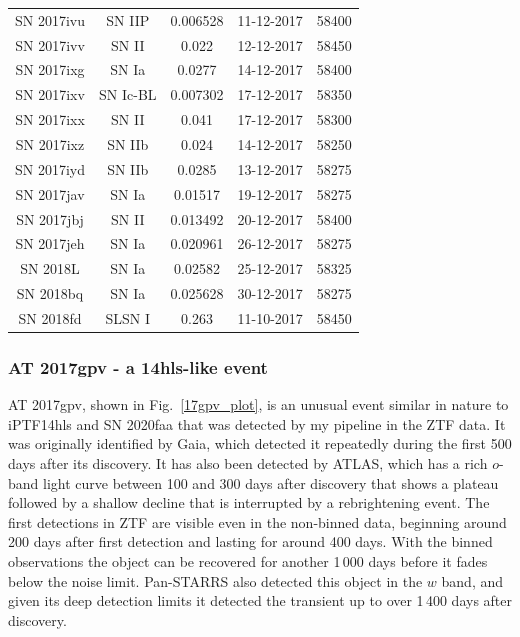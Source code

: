 \documentclass[a4paper,oneside,12pt, class=Latex/Classes/PhDthesisPSnPDF, crop=false]{standalone}
\begin{document}
\begin{longtable}{ccccc}
 SN 2017ivu & SN IIP & 0.006528 & 11-12-2017 & 58400 \\
 SN 2017ivv & SN II & 0.022 & 12-12-2017 & 58450 \\
 SN 2017ixg & SN Ia & 0.0277 & 14-12-2017 & 58400 \\
 SN 2017ixv & SN Ic-BL & 0.007302 & 17-12-2017 & 58350 \\
 SN 2017ixx & SN II & 0.041 & 17-12-2017 & 58300 \\
 SN 2017ixz & SN IIb & 0.024 & 14-12-2017 & 58250 \\
 SN 2017iyd & SN IIb & 0.0285 & 13-12-2017 & 58275 \\
 SN 2017jav & SN Ia & 0.01517 & 19-12-2017 & 58275 \\
 SN 2017jbj & SN II & 0.013492 & 20-12-2017 & 58400 \\
 SN 2017jeh & SN Ia & 0.020961 & 26-12-2017 & 58275 \\
 SN 2018L & SN Ia & 0.02582 & 25-12-2017 & 58325 \\
 SN 2018bq & SN Ia & 0.025628 & 30-12-2017 & 58275 \\
 SN 2018fd & SLSN I & 0.263 & 11-10-2017 & 58450 \\
\end{longtable}


\subsubsection{AT 2017gpv - a 14hls-like event}

AT 2017gpv, shown in Fig.~\ref{17gpv_plot}, is an unusual event similar in nature to iPTF14hls \citep{iPTF14hls_Iair, Sollerman_2019_iptf14hls} and SN 2020faa \citep{Yang_2021_20faa} that was detected by my pipeline in the ZTF data. It was originally identified by Gaia, which detected it repeatedly during the first 500 days after its discovery. It has also been detected by ATLAS, which has a rich $o$-band light curve between 100 and 300 days after discovery that shows a plateau followed by a shallow decline that is interrupted by a rebrightening event. The first detections in ZTF are visible even in the non-binned data, beginning around 200 days after first detection and lasting for around 400 days. With the binned observations the object can be recovered for another 1\,000 days before it fades below the noise limit. Pan-STARRS also detected this object in the $w$ band, and given its deep detection limits it detected the transient up to over 1\,400 days after discovery.
\end{document}
